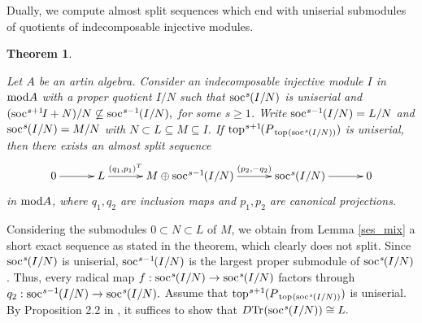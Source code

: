 \documentclass[10pt]{amsart}
\newtheorem{Theo}{Theorem}[subsection]
\theoremstyle{definition}
\newcommand{\mmod}{{\rm mod}}
\newcommand{\soc}{{\rm soc}\hspace{.5pt}}
\newcommand{\ntop}{{\rm top}\hspace{.5pt}}
\newcommand{\hp}{\hspace{.5pt}}
\begin{document}
\smallskip

Dually, we compute almost split sequences which end with uniserial submodules of quotients of indecomposable injective modules. \vspace{-2pt}

\begin{Theo}\label{ass_uni_soci}
    
Let $A$ be an artin algebra. Consider an indecomposable injective module $I$ in $\mmod A$ with a proper quotient $I/N$ such that $\soc^s\hspace{-.5pt}(I/N)$ is uniserial and $(\soc^{s+1}\hspace{-1.5pt}I+N)/N \not\subseteq \soc^{s-1}\hspace{-.5pt}(I/N),$ for some $s\ge 1$. Write $\soc^{s-1}\hspace{-.5pt}(I/N)=L/N$ and $\soc^s\hspace{-.5pt}(I/N)=M/N$ with $N\subset L \subseteq M\subseteq I$. If $\ntop^{s+1}\hspace{-1pt}(P{\hspace{.5pt}_{\ntop(\soc^s\hspace{-.5pt}(I/N))}})$ is uniserial, then there exists an almost split sequence \vspace{-6.5pt}
$$\xymatrixcolsep{30pt}\xymatrix{
0 \ar[r] & L \ar[r]^-{(q_1, p_1)^T}& M \oplus \soc^{s-1}\hspace{-.8pt}(I/N) \ar[r]^-{(p_2, -q_2)} & \soc^s\hspace{-.5pt}(I/N) \ar[r] & 0
} \vspace{-5pt} $$ in $\mmod A$, where $q_1, q_2$ are inclusion maps and $p_1, p_2$ are canonical projections.

\end{Theo}

\vspace{-1pt}

 Considering the submodules $0\subset N \subset L$ of $M$, we obtain from Lemma \ref{ses_mix} a short exact sequence as stated in the theorem, which clearly does not split. Since $\soc^s\hspace{-.6pt}(I/N)$ is uniserial, $\soc^{s-1}\hspace{-1pt}(I/N)$ is the largest proper submodule of $\soc^s\hspace{-.8pt}(I/N)$. Thus, every radical map $f: \soc^s\hspace{-.5pt}(I/N) \to \soc^s\hspace{-.5pt}(I/N)$ factors through $q_2: \soc^{s-1}\hspace{-.5pt}(I/N) \to \soc^s\hspace{-.5pt}(I/N).$ Assume that $\ntop^{s+1}\hspace{-.5pt}(P{\hspace{.5pt}_{\ntop(\soc^s\hspace{-.5pt}(I/N))}})$ is uniserial. \vspace{.5pt} By Proposition 2.2 in \cite[Chapter V]{ARS}, it suffices to show that $D{\rm Tr}\hp(\soc^s\hspace{-.5pt}(I/N))\cong L.$ 
\end{document}
